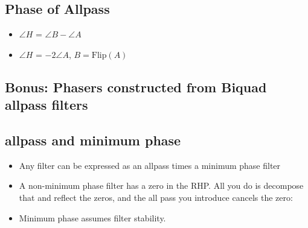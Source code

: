 \subsection*{Phase of Allpass}
\begin{itemize}
\item{$\angle H$ = $\angle B - \angle A$}
\item{$\angle H$ = $- 2\angle A$, $B = \mbox{Flip}(A)$}
\end{itemize}
\subsection*{Bonus: Phasers constructed from Biquad allpass filters}


\subsection*{allpass and minimum phase}
\begin{itemize}
\item{Any filter can be expressed as an allpass times a minimum phase
filter}
\item{A non-minimum phase filter has a zero in the RHP. All you do
is decompose that and reflect the zeros, and the all pass you introduce
cancels the zero:
}
\item{
Minimum phase assumes filter stability.
}
\end{itemize}

